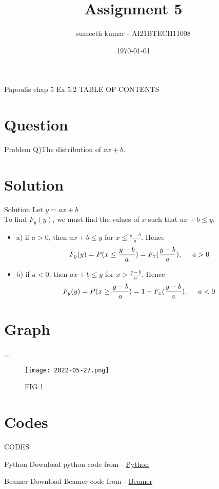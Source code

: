 \documentclass{beamer}
\title{Assignment 5}
\author{sumeeth kumar - AI21BTECH11008}
\date{\today}
\begin{document}
\begin{frame}
    \titlepage 
\end{frame}

\logo{}


\begin{frame}{Papoulis chap 5 Ex 5.2}
TABLE OF CONTENTS
    \tableofcontents
\end{frame}


\section{Question}
\begin{frame}{Problem}
Q)The distribution of $ax+b$. 
\end{frame}

\section{Solution}
\begin{frame}{Solution}
    Let $y = ax+b$ \\
    To find $F_y(y)$, we must find the values of $x$ such that $ax+b \le y$.
    \begin{itemize}
        \item a) if $a > 0$, then $ax+b \le y$ for $x \le \frac{y-b}{a}$. Hence 
        \begin{align}
            F_y(y) = P(x \le \frac{y-b}{a})= F_x(\frac{y-b}{a}) , \hspace{5mm}  a>0
        \end{align} 

        \item b) if $a < 0$, then $ax+b \le y$ for $x > \frac{y-b}{a}$. Hence 
        \begin{align}
            F_y(y) = P(x \ge \frac{y-b}{a})= 1-F_x(\frac{y-b}{a}) , \hspace{5mm}  a<0
        \end{align} 
        

        
    \end{itemize}

\end{frame}

\section{Graph}
\begin{frame}{...}
    \begin{figure}[!ht]
		\centering
		\texttt{[image: 2022-05-27.png]}
		\caption{FIG 1}
		\label{fig1}
	\end{figure}
\end{frame}

\section{Codes}
\begin{frame}{CODES}
    \begin{block}{Python}
         Download python code from - \href{...}{Python}
    \end{block}

 \begin{block}{Beamer}
         Download Beamer code from - \href{...}{Beamer}
    \end{block}
\end{frame} 
\end{document}
